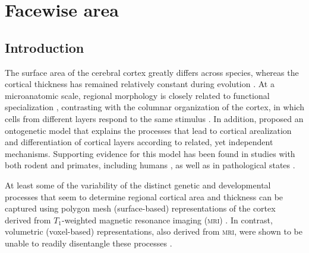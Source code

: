 \chapter{Facewise area}
\label{sec:facewise}
\setstretch{\lspac}

\section{Introduction}

The surface area of the cerebral cortex greatly differs across species, whereas the cortical thickness has remained relatively constant during evolution \citep{Mountcastle1998, Fish2008}. At a microanatomic scale, regional morphology is closely related to functional specialization \citep{Roland1998, Zilles2010}, contrasting with the columnar organization of the cortex, in which cells from different layers respond to the same stimulus \citep{EGJones2000, Buxhoeveden2002}. In addition, \citet{Rakic1988} proposed an ontogenetic model that explains the processes that lead to cortical arealization and differentiation of cortical layers according to related, yet independent mechanisms. Supporting evidence for this model has been found in studies with both rodent and primates, including humans \citep{Chenn2002, Rakic2009}, as well as in pathological states \citep{Rimol2010b, Bilguvar2010}.

At least some of the variability of the distinct genetic and developmental processes that seem to determine regional cortical area and thickness can be captured using polygon mesh (surface-based) representations of the cortex derived from $T_1$-weighted magnetic resonance imaging (\textsc{mri}) \citep{Panizzon2009, Winkler2010, SanabriaDiaz2010}. In contrast, volumetric (voxel-based) representations, also derived from \textsc{mri}, were shown to be unable to readily disentangle these processes \citep{Winkler2010}.

